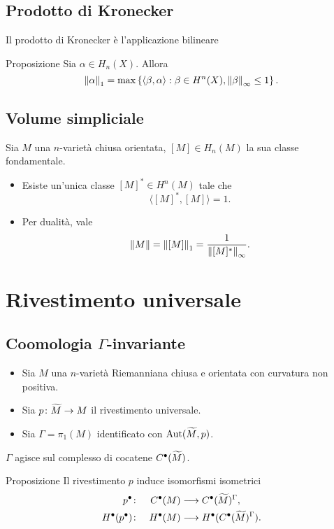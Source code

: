 \documentclass{beamer}
\begin{document}
\subsection{Prodotto di Kronecker}
\begin{frame}{\secname}{\subsecname}
Il prodotto di Kronecker è l'applicazione bilineare

\begin{block}{Proposizione}
Sia $\alpha\in H_n(X)$. Allora
\[
\left\lVert \alpha\right\rVert_1=\max\left\{\langle\beta,\alpha\rangle:\beta\in H^n(X),\left\lVert \beta\right\rVert_\infty\le 1\right\}.
\]
\end{block}
\end{frame}
\subsection{Volume simpliciale}
\begin{frame}{\secname}{\subsecname}
Sia $M$ una $n$-varietà chiusa orientata, $[M]\in H_n(M)$ la sua classe fondamentale.

\begin{itemize}
\item Esiste un'unica classe $[M]^*\in H^n(M)$ tale che
\[
\langle[M]^*,[M]\rangle=1.
\]
\item Per dualità, vale
\[
\left\lVert M\right\rVert=\left\lVert [M]\right\rVert_1=\frac{1}{\left\lVert [M]^*\right\rVert_\infty}.
\]
\end{itemize}
\end{frame}

\section{Rivestimento universale}
\subsection{Coomologia $\Gamma$-invariante}
\begin{frame}{\secname}{\subsecname}
\begin{itemize}
\item Sia $M$ una $n$-varietà Riemanniana chiusa e orientata con curvatura non positiva.
\item Sia $\map{p}{\widetilde M}{M}$ il rivestimento universale.
\item Sia $\Gamma=\pi_1(M)$ identificato con $\operatorname{Aut}(\widetilde M,p)$.
\end{itemize}

$\Gamma$ agisce sul complesso di cocatene $C^\bullet(\widetilde M)$.
\begin{block}{Proposizione}
Il rivestimento $p$ induce isomorfismi isometrici
\begin{alignat*}{2}
p^\bullet\colon&&C^\bullet(M)&\longrightarrow C^\bullet(\widetilde M)^\Gamma,\\
H^\bullet(p^\bullet)\colon&&H^\bullet(M)&\longrightarrow H^\bullet(C^\bullet(\widetilde M)^\Gamma).
\end{alignat*}
\end{block}
\end{frame}
\end{document}
